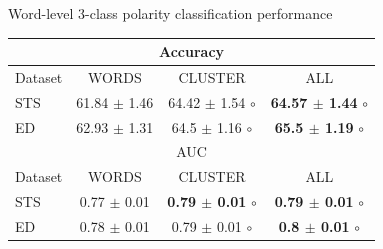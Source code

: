 \documentclass[handout]{beamer}
\begin{document}
\begin{frame}{Word-level 3-class polarity classification performance}
\begin{scriptsize}
\begin{table}[!htb]
\scriptsize
\begin{center}
\begin{tabular}{l|c|c|c}
\hline \hline
\multicolumn{ 4}{c}{Accuracy } \\ \hline \hline
Dataset & WORDS & CLUSTER & ALL \\ \hline
STS & 61.84 $\pm$ 1.46 & 64.42 $\pm$ 1.54 $\circ$ & \textbf{64.57 $\pm$ 1.44} $\circ$ \\
ED  & 62.93 $\pm$ 1.31 & 64.5 $\pm$ 1.16 $\circ$ & \textbf{65.5 $\pm$ 1.19} $\circ$ \\ 
 \hline \hline
\multicolumn{ 4}{c}{AUC} \\ \hline \hline
Dataset & WORDS & CLUSTER & ALL \\ \hline
STS & 0.77 $\pm$ 0.01 & \textbf{0.79 $\pm$ 0.01} $\circ$ & \textbf{0.79 $\pm$ 0.01} $\circ$ \\ 
ED  & 0.78 $\pm$ 0.01 & 0.79 $\pm$ 0.01 $\circ$ & \textbf{0.8 $\pm$ 0.01} $\circ$ \\ 
\hline
\end{tabular}
\end{center}
\end{table}
\end{scriptsize}
\end{frame}
\end{document}
